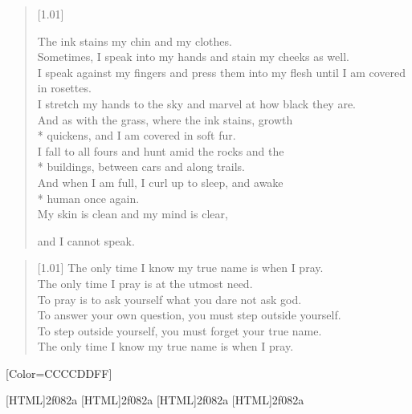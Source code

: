 \begin{paracol}{2}
\begin{verse}[1.01\textwidth]
{    The ink stains my chin and my clothes.\\
    \vin Sometimes, I speak into my hands and stain my cheeks as well.\\
    \vin \vin I speak against my fingers and press them into my flesh until I am covered in rosettes.\\
    \vin \vin \vin I stretch my hands to the sky and marvel at how black they are.\\
    \vin \vin \vin \vin And as with the grass, where the ink stains, growth\\*
    \vin \vin \vin \vin quickens, and I am covered in soft fur.\\
    \vin \vin \vin \vin \vin I fall to all fours and hunt amid the rocks and the\\*
    \vin \vin \vin \vin \vin buildings, between cars and along trails.\\
    \vin \vin \vin \vin \vin \vin And when I am full, I curl up to sleep, and awake\\*
    \vin \vin \vin \vin \vin \vin human once again.\\
    \vin \vin \vin \vin \vin \vin \vin My skin is clean and my mind is clear,

    and I cannot speak.}
\end{verse}
\vfill
\newpage

\null
\vfill
\begin{verse}[1.01\textwidth]
    The only time I know my true name is when I pray.\\
    The only time I pray is at the utmost need.\\
    To pray is to ask yourself what you dare not ask god.\\
    To answer your own question, you must step outside yourself.\\
    To step outside yourself, you must forget your true name.\\
    The only time I know my true name is when I pray.
\end{verse}
\vfill
{}
\flushpage
\end{paracol}


\renewfontfamily{}[Color=CCCCDDFF]

[HTML]{2f082a}
[HTML]{2f082a}
[HTML]{2f082a}
[HTML]{2f082a}

